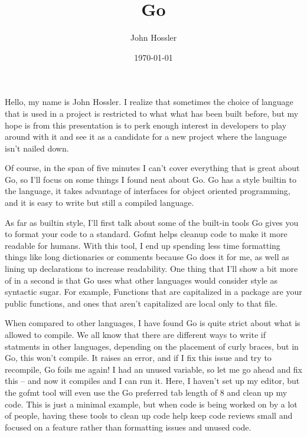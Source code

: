 \documentclass[12pt, letterpaper]{article}
\title{Go}
\author{John Hossler}
\date{\today}
\begin{document}
\maketitle

\par
Hello, my name is John Hossler. I realize that sometimes the choice of language that is used in a project is restricted to what
what has been built before, but my hope is from this presentation is to perk enough interest
in developers to play around with it and see it as a candidate for a new project where
the language isn't nailed down.

\par
Of course, in the span of five minutes I can't cover everything that is great about Go,
so I'll focus on some things I found neat about Go. Go has a style builtin to the language,
it takes advantage of interfaces for object oriented programming, and
it is easy to write but still a compiled language.

\par
As far as builtin style, I'll first talk about some of the built-in
tools Go gives you to format your code to a standard.
Gofmt helps cleanup code to make it more readable for humans.
With this tool, I end up spending less
time formatting things like long dictionaries or comments because Go does
it for me, as well as lining up declarations to increase readability.
One thing that I'll show a bit more of in a second is that Go uses what
other languages would consider style as syntactic sugar. For example,
Functions that are capitalized in a package are your public functions,
and ones that aren't capitalized are local only to that file.

\par
When compared to other languages, I have found Go is quite strict about
what is allowed to compile. We all know that there are different ways
to write if statments in other languages, depending on the placement of
curly braces, but in Go, this won't compile. It raises an error, and if I
fix this issue and try to recompile, Go foils me again! I had an unused
variable, so let me go ahead and fix this -- and now it compiles and I can
run it. Here, I haven't set up my editor, but the gofmt tool will even
use the Go preferred tab length of 8 and clean up my code. This is just
a minimal example, but when code is being worked on by a lot of people,
having these tools to clean up code help keep code reviews
small and focused on a feature rather than formatting issues and unused
code.
\end{document}
